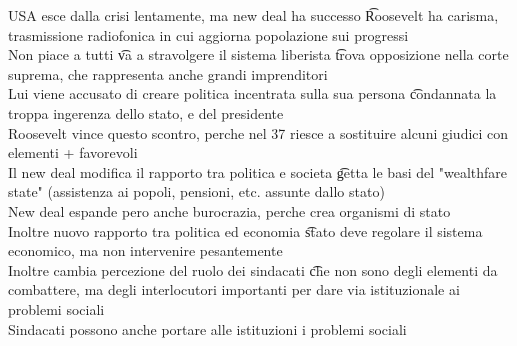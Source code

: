\documentclass[12pt]{article}
\begin{document}
USA esce dalla crisi lentamente, ma new deal ha successo \t Roosevelt ha carisma, trasmissione radiofonica in cui aggiorna popolazione sui progressi \\
Non piace a tutti \t va a stravolgere il sistema liberista \t trova opposizione nella corte suprema, che rappresenta anche grandi imprenditori \\
Lui viene accusato di creare politica incentrata sulla sua persona \t condannata la troppa ingerenza dello stato, e del presidente \\
Roosevelt vince questo scontro, perche nel 37 riesce a sostituire alcuni giudici con elementi + favorevoli \\
Il new deal modifica il rapporto tra politica e societa \t getta le basi del "wealthfare state" (assistenza ai popoli, pensioni, etc. assunte dallo stato) \\
New deal espande pero anche burocrazia, perche crea organismi di stato \\
Inoltre nuovo rapporto tra politica ed economia \t stato deve regolare il sistema economico, ma non intervenire pesantemente \\
Inoltre cambia percezione del ruolo dei sindacati \t che non sono degli elementi da combattere, ma degli interlocutori importanti per dare via istituzionale ai problemi sociali \\
Sindacati possono anche portare alle istituzioni i problemi sociali
\end{document}
